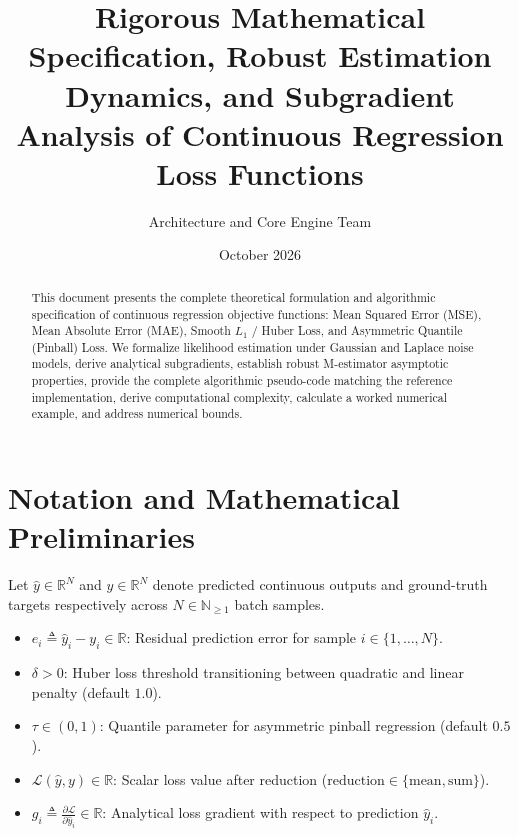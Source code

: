 \documentclass[11pt,a4paper]{article}
\title{\textbf{Rigorous Mathematical Specification, Robust Estimation Dynamics, and Subgradient Analysis of Continuous Regression Loss Functions}}
\author{Architecture and Core Engine Team}
\date{October 2026}
\theoremstyle{definition}
\begin{document}
\maketitle

\begin{abstract}
This document presents the complete theoretical formulation and algorithmic specification of continuous regression objective functions: Mean Squared Error (MSE), Mean Absolute Error (MAE), Smooth $L_1$ / Huber Loss, and Asymmetric Quantile (Pinball) Loss. We formalize likelihood estimation under Gaussian and Laplace noise models, derive analytical subgradients, establish robust M-estimator asymptotic properties, provide the complete algorithmic pseudo-code matching the reference implementation, derive computational complexity, calculate a worked numerical example, and address numerical bounds.
\end{abstract}

\section{Notation and Mathematical Preliminaries}

Let $\hat{y} \in \mathbb{R}^N$ and $y \in \mathbb{R}^N$ denote predicted continuous outputs and ground-truth targets respectively across $N \in \mathbb{N}_{\ge 1}$ batch samples.

\begin{itemize}
    \item $e_i \triangleq \hat{y}_i - y_i \in \mathbb{R}$: Residual prediction error for sample $i \in \{1, \dots, N\}$.
    \item $\delta > 0$: Huber loss threshold transitioning between quadratic and linear penalty (default $1.0$).
    \item $\tau \in (0, 1)$: Quantile parameter for asymmetric pinball regression (default $0.5$).
    \item $\mathcal{L}(\hat{y}, y) \in \mathbb{R}$: Scalar loss value after reduction ($\text{reduction} \in \{\text{mean}, \text{sum}\}$).
    \item $g_i \triangleq \frac{\partial \mathcal{L}}{\partial \hat{y}_i} \in \mathbb{R}$: Analytical loss gradient with respect to prediction $\hat{y}_i$.
\end{itemize}
\end{document}
